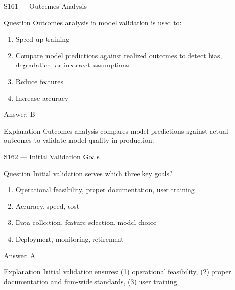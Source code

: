 \documentclass[aspectratio=169,8pt]{beamer}
\begin{document}
	\begin{frame}{S161 --- Outcomes Analysis}
		\begin{block}{Question}
			Outcomes analysis in model validation is used to:
			\begin{enumerate}
				\item Speed up training
				\item Compare model predictions against realized outcomes to detect bias, degradation, or incorrect assumptions
				\item Reduce features
				\item Increase accuracy
			\end{enumerate}
		\end{block}
		\begin{exampleblock}{Answer: B}\end{exampleblock}
		\begin{block}{Explanation}
			Outcomes analysis compares model predictions against actual outcomes to validate model quality in production.
		\end{block}
	\end{frame}
	
	\begin{frame}{S162 --- Initial Validation Goals}
		\begin{block}{Question}
			Initial validation serves which three key goals?
			\begin{enumerate}
				\item Operational feasibility, proper documentation, user training
				\item Accuracy, speed, cost
				\item Data collection, feature selection, model choice
				\item Deployment, monitoring, retirement
			\end{enumerate}
		\end{block}
		\begin{exampleblock}{Answer: A}\end{exampleblock}
		\begin{block}{Explanation}
			Initial validation ensures: (1) operational feasibility, (2) proper documentation and firm-wide standards, (3) user training.
		\end{block}
	\end{frame}
	
\end{document}
